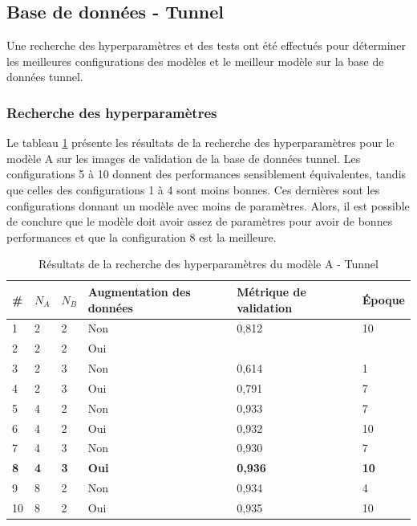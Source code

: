 \subsection{Base de données - Tunnel}
    Une recherche des hyperparamètres et des tests ont été effectués pour déterminer les meilleures configurations des modèles et le meilleur modèle sur la base de données tunnel.

\subsubsection{Recherche des hyperparamètres}
    Le tableau \ref{tab:resultat_tunnel_modele_a} présente les résultats de la recherche des hyperparamètres pour le modèle A sur les images de validation de la base de données tunnel. Les configurations 5 à 10 donnent des performances sensiblement équivalentes, tandis que celles des configurations 1 à 4 sont moins bonnes. Ces dernières sont les configurations donnant un modèle avec moins de paramètres. Alors, il est possible de conclure que le modèle doit avoir assez de paramètres pour avoir de bonnes performances et que la configuration 8 est la meilleure.\\
    
    \begin{table}
        \centering
        \caption{Résultats de la recherche des hyperparamètres du modèle A - Tunnel}
        \label{tab:resultat_tunnel_modele_a}
        \begin{tabular}{lllp{3cm}p{3cm}l}
            \midrule
            \# & \(N_A\) & \(N_B\) & Augmentation des données & Métrique de validation & Époque\\
            \midrule\midrule
            1  & 2 & 2 & Non & 0,812 & 10\\
            2  & 2 & 2 & Oui & \\
            3  & 2 & 3 & Non & 0,614 & 1\\
            4  & 2 & 3 & Oui & 0,791 & 7\\
            5  & 4 & 2 & Non & 0,933 & 7\\
            6  & 4 & 2 & Oui & 0,932 & 10\\
            7  & 4 & 3 & Non & 0,930 & 7\\
            \textbf{8}  & \textbf{4} & \textbf{3} & \textbf{Oui} & \textbf{0,936} & \textbf{10}\\
            9  & 8 & 2 & Non & 0,934 & 4\\
            10 & 8 & 2 & Oui & 0,935 & 10\\
            \midrule
        \end{tabular}
    \end{table}

